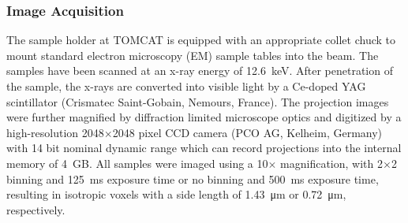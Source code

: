 \subsubsection{Image Acquisition}
\label{seq:Image Acquisition}
The sample holder at TOMCAT is equipped with an appropriate collet chuck to mount standard electron microscopy (EM) sample tables into the beam. The samples have been scanned at an x-ray energy of \SI{12.6}{\kilo\electronvolt}. After penetration of the sample, the x-rays are converted into visible light by a Ce-doped YAG scintillator (Crismatec Saint-Gobain, Nemours, France). The projection images were further magnified by diffraction limited microscope optics and digitized by a high-resolution 2048$\times$2048 pixel CCD camera (PCO AG, Kelheim, Germany) with 14 bit nominal dynamic range which can record projections into the internal memory of \SI{4}{\giga B}. All samples were imaged using a 10$\times$ magnification, with 2$\times$2 binning and \SI{125}{\milli\second} exposure time or no binning and \SI{500}{\milli\second} exposure time, resulting in isotropic voxels with a side length of \SI{1.43}{\micro\meter} or \SI{0.72}{\micro\meter}, respectively.

